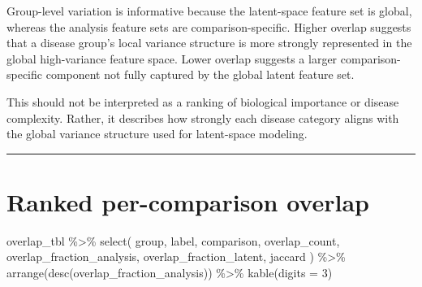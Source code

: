 \documentclass[
  letterpaper,
  DIV=11,
  numbers=noendperiod,
  openany,
  oneside]{scrreprt}
\newenvironment{Shaded}{\begin{snugshade}}{\end{snugshade}}
\newcommand{\AttributeTok}[1]{\textcolor[rgb]{0.40,0.45,0.13}{#1}}
\newcommand{\DecValTok}[1]{\textcolor[rgb]{0.68,0.00,0.00}{#1}}
\newcommand{\FunctionTok}[1]{\textcolor[rgb]{0.28,0.35,0.67}{#1}}
\newcommand{\NormalTok}[1]{\textcolor[rgb]{0.00,0.23,0.31}{#1}}
\newcommand{\SpecialCharTok}[1]{\textcolor[rgb]{0.37,0.37,0.37}{#1}}
\begin{document}
Group-level variation is informative because the latent-space feature
set is global, whereas the analysis feature sets are
comparison-specific. Higher overlap suggests that a disease group's
local variance structure is more strongly represented in the global
high-variance feature space. Lower overlap suggests a larger
comparison-specific component not fully captured by the global latent
feature set.

This should not be interpreted as a ranking of biological importance or
disease complexity. Rather, it describes how strongly each disease
category aligns with the global variance structure used for latent-space
modeling.

\begin{center}\rule{0.5\linewidth}{0.5pt}\end{center}

\section{Ranked per-comparison
overlap}\label{ranked-per-comparison-overlap}

\begin{Shaded}
\begin{Highlighting}[]
\NormalTok{overlap\_tbl }\SpecialCharTok{\%\textgreater{}\%}
  \FunctionTok{select}\NormalTok{(}
\NormalTok{    group,}
\NormalTok{    label,}
\NormalTok{    comparison,}
\NormalTok{    overlap\_count,}
\NormalTok{    overlap\_fraction\_analysis,}
\NormalTok{    overlap\_fraction\_latent,}
\NormalTok{    jaccard}
\NormalTok{  ) }\SpecialCharTok{\%\textgreater{}\%}
  \FunctionTok{arrange}\NormalTok{(}\FunctionTok{desc}\NormalTok{(overlap\_fraction\_analysis)) }\SpecialCharTok{\%\textgreater{}\%}
  \FunctionTok{kable}\NormalTok{(}\AttributeTok{digits =} \DecValTok{3}\NormalTok{)}
\end{Highlighting}
\end{Shaded}
\end{document}
